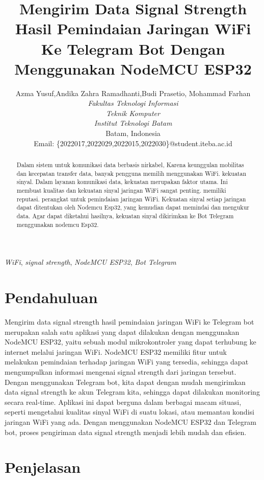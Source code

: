 \documentclass[conference]{IEEEtran}
\title{Mengirim Data Signal Strength Hasil Pemindaian Jaringan WiFi Ke Telegram Bot Dengan Menggunakan NodeMCU ESP32}
\author{Azma Yusuf\IEEEauthorrefmark{1},Andika Zahra Ramadhanti\IEEEauthorrefmark{2},Budi Prasetio\IEEEauthorrefmark{3}, Mohammad Farhan\IEEEauthorrefmark{4}\\
\textit{Fakultas Teknologi Informasi}\\
\textit{Teknik Komputer}\\
\textit{Institut Teknologi Batam}\\
Batam, Indonesia\\
Email: \{\IEEEauthorrefmark{1}2022017,\IEEEauthorrefmark{2}2022029,\IEEEauthorrefmark{3}2022015,\IEEEauthorrefmark{4}2022030\}@student.iteba.ac.id}
\begin{document}
\maketitle
\begin{abstract}
    Dalam sistem untuk komunikasi data berbasis nirkabel,
    Karena keunggulan mobilitas dan kecepatan transfer data, banyak pengguna memilih menggunakan WiFi. kekuatan sinyal.
    Dalam layanan komunikasi data, kekuatan merupakan faktor utama.
    Ini membuat kualitas dan kekuatan sinyal jaringan WiFi sangat penting.
    memiliki reputasi. perangkat untuk pemindaian jaringan WiFi.
    Kekuatan sinyal setiap jaringan dapat ditentukan oleh Nodemcu Esp32, yang kemudian dapat memindai dan mengukur data.
    Agar dapat diketahui hasilnya, kekuatan sinyal dikirimkan ke Bot Telegram menggunakan nodemcu Esp32.
\end{abstract}
\vspace{0.2cm}
\begin{IEEEkeywords}
    \emph{WiFi}, \emph{signal strength}, \emph{NodeMCU ESP32}, \emph{Bot Telegram}
\end{IEEEkeywords}
\section{Pendahuluan}
Mengirim data signal strength hasil pemindaian jaringan WiFi ke Telegram bot merupakan salah satu aplikasi yang dapat dilakukan dengan menggunakan NodeMCU ESP32, yaitu sebuah modul mikrokontroler yang dapat terhubung ke internet melalui jaringan WiFi. NodeMCU ESP32 memiliki fitur untuk melakukan pemindaian terhadap jaringan WiFi yang tersedia, sehingga dapat mengumpulkan informasi mengenai signal strength dari jaringan tersebut. Dengan menggunakan Telegram bot, kita dapat dengan mudah mengirimkan data signal strength ke akun Telegram kita, sehingga dapat dilakukan monitoring secara real-time. Aplikasi ini dapat berguna dalam berbagai macam situasi, seperti mengetahui kualitas sinyal WiFi di suatu lokasi, atau memantau kondisi jaringan WiFi yang ada. Dengan menggunakan NodeMCU ESP32 dan Telegram bot, proses pengiriman data signal strength menjadi lebih mudah dan efisien.

\section{Penjelasan}
\end{document}
